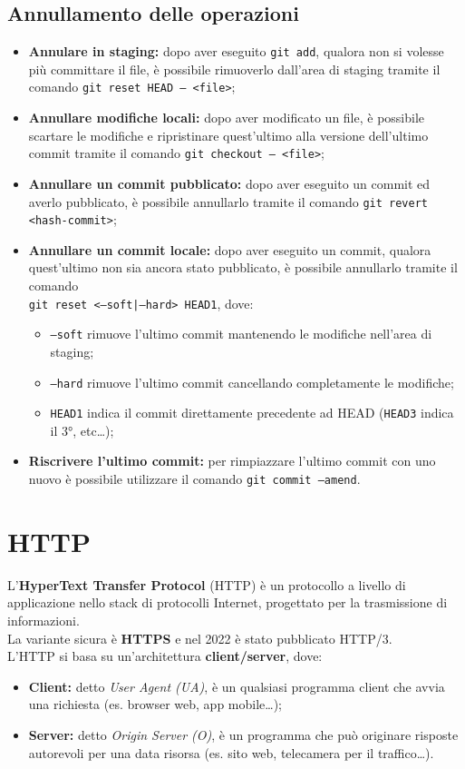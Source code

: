 \documentclass[12pt]{article}
\begin{document}
\subsection{Annullamento delle operazioni}
\begin{itemize}
\item \textbf{Annulare in staging:} dopo aver eseguito \texttt{git add}, qualora non si volesse più committare il file, è possibile rimuoverlo dall'area di staging tramite il comando \texttt{git reset HEAD -- <file>};
\item \textbf{Annullare modifiche locali:} dopo aver modificato un file, è possibile scartare le modifiche e ripristinare quest'ultimo alla versione dell'ultimo commit tramite il comando \texttt{git checkout -- <file>};
\item \textbf{Annullare un commit pubblicato:} dopo aver eseguito un commit ed averlo pubblicato, è possibile annullarlo tramite il comando \texttt{git revert <hash-commit>};
\item \textbf{Annullare un commit locale:} dopo aver eseguito un commit, qualora quest'ultimo non sia ancora stato pubblicato, è possibile annullarlo tramite il comando\\\texttt{git reset <--soft|--hard> HEAD\raisebox{-0.5ex}{\~{}}1}, dove:
\begin{itemize}
\item \texttt{--soft} rimuove l'ultimo commit mantenendo le modifiche nell'area di staging;
\item \texttt{--hard} rimuove l'ultimo commit cancellando completamente le modifiche;
\item \texttt{HEAD\raisebox{-0.5ex}{\~{}}1} indica il commit direttamente precedente ad HEAD (\texttt{HEAD\raisebox{-0.5ex}{\~{}}3} indica il 3°, etc\dots); 
\end{itemize}
\item \textbf{Riscrivere l'ultimo commit:} per rimpiazzare l'ultimo commit con uno nuovo è possibile utilizzare il comando \texttt{git commit --amend}.
\end{itemize}

\newpage
\section{HTTP}
L'\textbf{HyperText Transfer Protocol} (HTTP) è un protocollo a livello di applicazione nello stack di protocolli Internet, progettato per la trasmissione di informazioni.\\
La variante sicura è \textbf{HTTPS} e nel 2022 è stato pubblicato HTTP/3.\\
L'HTTP si basa su un'architettura \textbf{client/server}, dove:
\begin{itemize}
\item \textbf{Client:} detto \textit{User Agent (UA)}, è un qualsiasi programma client che avvia una richiesta (es. browser web, app mobile\dots);
\item \textbf{Server:} detto \textit{Origin Server (O)}, è un programma che può originare risposte autorevoli per una data risorsa (es. sito web, telecamera per il traffico\dots).
\end{itemize}
\end{document}
